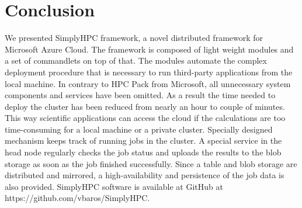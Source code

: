 \documentclass[3p,times]{elsarticle}
\begin{document}
%

\section{Conclusion}
\label{sec:conclusions}

We presented SimplyHPC framework, a novel distributed framework for Microsoft Azure Cloud. The framework is composed of light weight modules and a set of commandlets on top of that. The modules automate the complex deployment procedure that is necessary to run third-party applications from the local machine. In contrary to HPC Pack from Microsoft, all unnecessary system components and services have been omitted. As a result the time needed to deploy the cluster has been reduced from nearly an hour to couple of minutes.  This way scientific applications can access the cloud if the calculations are too time-consuming for a local machine or a private cluster. Specially designed mechanism keeps track of running jobs in the cluster. A special service in the head node regularly checks the job status and uploads the results to the blob storage as soon as the job finished successfully. Since a table and blob storage are distributed and mirrored, a high-availability and persistence of the job data is also provided. SimplyHPC software is available at GitHub at https://github.com/vbaros/SimplyHPC.


\end{document}
